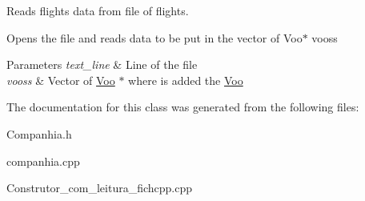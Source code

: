 Reads flights data from file of flights. 

Opens the file and reads data to be put in the vector of Voo$\ast$ vooss


\begin{DoxyParams}{Parameters}
{\em text\+\_\+line} & Line of the file \\
\hline
{\em vooss} & Vector of \hyperlink{class_voo}{Voo} $\ast$ where is added the \hyperlink{class_voo}{Voo} \\
\hline
\end{DoxyParams}


The documentation for this class was generated from the following files\+:\begin{DoxyCompactItemize}
\item 
Companhia.\+h\item 
companhia.\+cpp\item 
Construtor\+\_\+com\+\_\+leitura\+\_\+fichcpp.\+cpp\end{DoxyCompactItemize}
